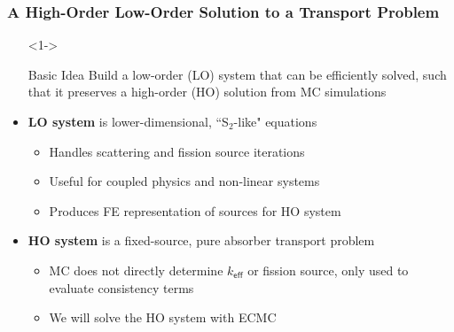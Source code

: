 \documentclass[xcolor=dvipsnames]{beamer}
\newcommand{\keff}[0]{\ensuremath{{k}_{\textsf{eff}}} }
\newcommand{\colb}[1]{{\color{blue} #1}}
\newlength{\wideitemsep}
\let\olditem\item
\renewcommand{\item}{\setlength{\itemsep}{\wideitemsep}\olditem}
\begin{document}
\begin{frame}
    \frametitle{A High-Order Low-Order Solution to a Transport Problem}
        \begin{itemize}
            \item[]<1-> \begin{block}{Basic Idea} Build a low-order (LO) system that can be efficiently solved,
                such that it preserves a high-order (HO) solution from MC simulations \end{block}
                \vspace{-0.3in}
              \item<3-> \textbf{LO system} is lower-dimensional,  ``S$_2$-like" equations
                \begin{itemize}
                    \item<3-> Handles scattering and fission source iterations
                    \item<3-> Useful for coupled physics and non-linear systems
                    \item<3-> Produces \colb{FE representation of sources} for HO system
                \end{itemize}
            \item<4-> \textbf{HO system} is a fixed-source, pure absorber transport problem
                \begin{itemize}
                    \item  MC does not directly determine $\keff$ or fission source,
                        only used to \colb{evaluate consistency terms} 
                    \item We will solve the HO system with ECMC
                \end{itemize}
        \end{itemize}
\end{frame}
\end{document}
